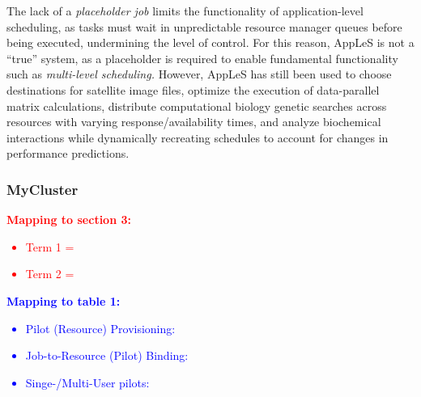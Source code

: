 \documentclass{sig-alternate}
\begin{document}
The lack of a \textit{placeholder job} limits the functionality 
of application-level scheduling, as tasks
must wait in unpredictable resource manager queues before being executed,
undermining the level of control.  For this reason, AppLeS
is not a ``true'' \pilotjob system, as a placeholder
is required to enable fundamental \pilotjob functionality such as
\textit{multi-level scheduling.}
However, AppLeS has still been used to choose destinations
for satellite image files, optimize the execution of data-parallel matrix
calculations, distribute computational biology genetic searches 
across resources with varying response/availability times, and
analyze biochemical interactions while dynamically recreating
schedules to account for changes in performance predictions.



%
\subsubsection{MyCluster}

\textcolor{red}
{
\textbf{Mapping to section 3:}
\begin{itemize}
\item Term 1 =
\item Term 2 =
\end{itemize}
}

\textcolor{blue}
{
\textbf{Mapping to table 1:}
\begin{itemize}
\item Pilot (Resource) Provisioning:
\item Job-to-Resource (Pilot) Binding:
\item Singe-/Multi-User pilots:
\end{itemize}
}
\end{document}
